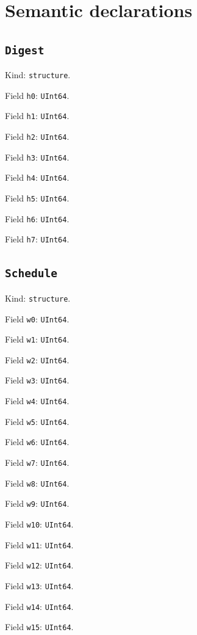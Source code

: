 \documentclass[11pt]{article}
\begin{document}
\section*{Semantic declarations}
\subsection*{\texttt{Digest}}
\noindent Kind: \texttt{structure}.\par
\noindent Field \texttt{h0}: \texttt{UInt64}.\par
\noindent Field \texttt{h1}: \texttt{UInt64}.\par
\noindent Field \texttt{h2}: \texttt{UInt64}.\par
\noindent Field \texttt{h3}: \texttt{UInt64}.\par
\noindent Field \texttt{h4}: \texttt{UInt64}.\par
\noindent Field \texttt{h5}: \texttt{UInt64}.\par
\noindent Field \texttt{h6}: \texttt{UInt64}.\par
\noindent Field \texttt{h7}: \texttt{UInt64}.\par
\subsection*{\texttt{Schedule}}
\noindent Kind: \texttt{structure}.\par
\noindent Field \texttt{w0}: \texttt{UInt64}.\par
\noindent Field \texttt{w1}: \texttt{UInt64}.\par
\noindent Field \texttt{w2}: \texttt{UInt64}.\par
\noindent Field \texttt{w3}: \texttt{UInt64}.\par
\noindent Field \texttt{w4}: \texttt{UInt64}.\par
\noindent Field \texttt{w5}: \texttt{UInt64}.\par
\noindent Field \texttt{w6}: \texttt{UInt64}.\par
\noindent Field \texttt{w7}: \texttt{UInt64}.\par
\noindent Field \texttt{w8}: \texttt{UInt64}.\par
\noindent Field \texttt{w9}: \texttt{UInt64}.\par
\noindent Field \texttt{w10}: \texttt{UInt64}.\par
\noindent Field \texttt{w11}: \texttt{UInt64}.\par
\noindent Field \texttt{w12}: \texttt{UInt64}.\par
\noindent Field \texttt{w13}: \texttt{UInt64}.\par
\noindent Field \texttt{w14}: \texttt{UInt64}.\par
\noindent Field \texttt{w15}: \texttt{UInt64}.\par
\end{document}
